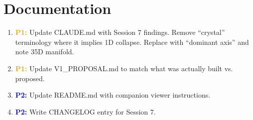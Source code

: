\documentclass[11pt]{article}
\newcommand{\sec}[1]{\textcolor{orange}{\textbf{P1:}} #1}
\newcommand{\ter}[1]{\textcolor{blue}{\textbf{P2:}} #1}
\begin{document}
\section{Documentation}

\begin{enumerate}[label=\arabic*.]
\item \sec{Update CLAUDE.md with Session 7 findings. Remove ``crystal'' terminology where it implies 1D collapse. Replace with ``dominant axis'' and note 35D manifold.}
\item \sec{Update V1\_PROPOSAL.md to match what was actually built vs. proposed.}
\item \ter{Update README.md with companion viewer instructions.}
\item \ter{Write CHANGELOG entry for Session 7.}
\end{enumerate}
\end{document}

